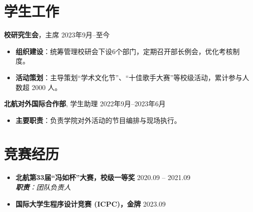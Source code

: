 \documentclass[11pt]{article}
\newlength{\iconwidth}
\begin{document}
    \begin{minipage}[t]{\textwidth}
        \section[学生工作]{\makebox[\iconwidth][c]{\color{primary_color}{\faUsers}}\quad 学生工作}
        
        \vspace{0.5em}
        {\large \textbf{校研究生会}}，主席 \hfill 2023年9月--至今
        \begin{itemize}
            \item \textbf{组织建设}：统筹管理校研会下设6个部门，定期召开部长例会，优化考核制度。
            \item \textbf{活动策划}：主导策划“学术文化节”、“十佳歌手大赛”等校级活动，累计参与人数超 2000 人。
        \end{itemize}

        \vspace{0.6em}
        {\large \textbf{北航对外国际合作部}}, 学生助理 \hfill 2022年9月--2023年6月
        \begin{itemize}
            \item \textbf{主要职责}：负责学院对外活动的节目编排与现场执行。
        \end{itemize}
        
        \vspace{1.2em}
    \end{minipage}
    
    
    \begin{minipage}[t]{\textwidth}
        \section[竞赛经历]{\makebox[\iconwidth][c]{\color{primary_color}{\faTrophy}}\quad 竞赛经历}
            \begin{itemize}
                \setlength{\itemsep}{0.5em} %
                \item \textbf{北航第33届“冯如杯”大赛，校级一等奖} \hfill 2020.09 -- 2021.09 \\
                      \textit{\textbf{职责}：团队负责人} %
                \item \textbf{国际大学生程序设计竞赛 (ICPC)，金牌 } \hfill 2023.09
            \end{itemize}
    \end{minipage}
\end{document}
